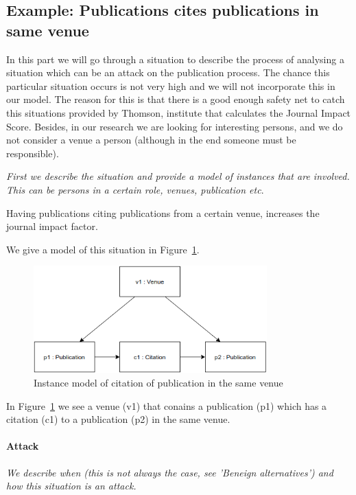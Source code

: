 \documentclass{ou-report}
\begin{document}
\subsection{Example: Publications cites publications in same venue}
\label{interesting_case:publications_cites_publications_in_same_venue}
In this part we will go through a situation to describe the process of analysing
a situation which can be an attack on the publication process. The chance this 
particular situation occurs is not very high and we will
not incorporate this in our model. The reason for this is that there is a good
enough safety net to catch this situations provided by Thomson, institute that 
calculates the Journal Impact Score. Besides, in our research we are looking for
interesting persons, and we do not consider a venue a person (although in the
end someone must be responsible).

\textit{First we describe the situation and provide a model of instances that 
are involved. This can be persons in a certain role, venues, publication etc}.

Having publications citing publications from a certain venue, increases the 
journal impact factor.

We give a model of this situation in Figure~\ref{fig:cpsv}.

\begin{figure}[H]
\centering
\includegraphics[width=9cm]{images/cited_publications_same_journal.drawio.png}
\caption{Instance model of citation of publication in the same venue}
\label{fig:cpsv}
\end{figure}

In Figure~\ref{fig:cpsv} we see a venue (v1) that conains a publication (p1)
which has a citation (c1) to a publication (p2) in the same venue.
\paragraph{Attack}
\textit{We describe when (this is not always the case, see 'Beneign 
alternatives') and how this situation is an attack.} 
\end{document}
